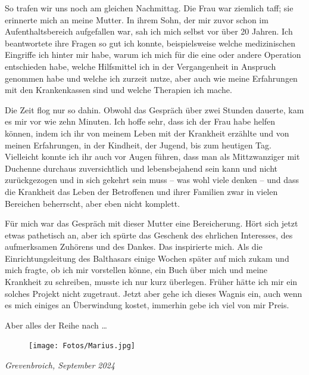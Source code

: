 \documentclass[fontsize=14pt,a4paper,headinclude,DIV=calc,automark]{scrbook}
\begin{document}
So trafen wir uns noch am gleichen Nachmittag. Die Frau war ziemlich taff; sie erinnerte mich an meine Mutter. In ihrem Sohn, der mir zuvor schon im Aufenthaltsbereich aufgefallen war, sah ich mich selbst vor über 20 Jahren. Ich beantwortete ihre Fragen so gut ich konnte, beispielsweise welche medizinischen Eingriffe ich hinter mir habe, warum ich mich für die eine oder andere Operation entschieden habe, welche Hilfsmittel ich in der Vergangenheit in Anspruch genommen habe und welche ich zurzeit nutze, aber auch wie meine Erfahrungen mit den Krankenkassen sind und welche Therapien ich mache.

Die Zeit flog nur so dahin. Obwohl das Gespräch über zwei Stunden dauerte, kam es mir vor wie zehn Minuten. Ich hoffe sehr, dass ich der Frau habe helfen können, indem ich ihr von meinem Leben mit der Krankheit erzählte und von meinen Erfahrungen, in der Kindheit, der Jugend, bis zum heutigen Tag. Vielleicht konnte ich ihr auch vor Augen führen, dass man als Mittzwanziger mit Duchenne durchaus zuversichtlich und lebensbejahend sein kann und nicht zurückgezogen und in sich gekehrt sein muss – was wohl viele denken – und dass die Krankheit das Leben der Betroffenen und ihrer Familien zwar in vielen Bereichen beherrscht, aber eben nicht komplett.

Für mich war das Gespräch mit dieser Mutter eine Bereicherung. Hört sich jetzt etwas pathetisch an, aber ich spürte das Geschenk des ehrlichen Interesses, des aufmerksamen Zuhörens und des Dankes. Das inspirierte mich. Als die Einrichtungsleitung des Balthasars einige Wochen später auf mich zukam und mich fragte, ob ich mir vorstellen könne, ein Buch über mich und meine Krankheit zu schreiben, musste ich nur kurz überlegen. Früher hätte ich mir ein solches Projekt nicht zugetraut. Jetzt aber gehe ich dieses Wagnis ein, auch wenn es mich einiges an Überwindung kostet, immerhin gebe ich viel von mir Preis.

\noindent Aber alles der Reihe nach …

\begin{figure}[H]
    \raggedright
    \texttt{[image: Fotos/Marius.jpg]}
\end{figure}
\noindent\small\textit{Grevenbroich, September 2024}


\mainmatter

\clearpairofpagestyles %
\rehead{\leftmark}     %
\lehead{\thepage}      %
\rohead{\thepage}      %
\lohead{\leftmark}     %
\end{document}
